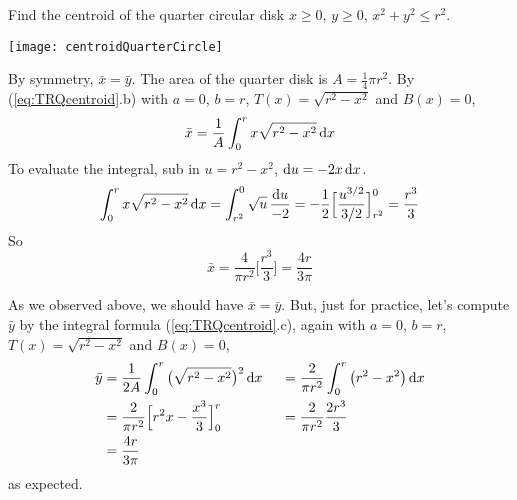 \goodbreak
\begin{eg}\label{eg:TRQcentroidBa}
  Find the centroid of the quarter circular disk $x\ge 0$,
$y\ge 0$, $x^2+y^2\le r^2$.

\begin{efig}
\begin{center}
    \texttt{[image: centroidQuarterCircle]}
\end{center}
\end{efig}

\soln  By symmetry, $\bar x=\bar y$. The area of the quarter disk
is $A=\frac{1}{4}\pi r^2$. By (\ref{eq:TRQcentroid}.b) with $a=0$, $b=r$,
$T(x)=\sqrt{r^2-x^2}$ and $B(x)=0$,
\begin{equation*}
\bar x = \frac{1}{A}\int_0^r x\sqrt{r^2-x^2}\,\mathrm{d}x
\end{equation*}
To evaluate the integral, sub in $u=r^2-x^2$, $\mathrm{d}u=-2x\,\mathrm{d}x$.
\begin{equation}\label{eq:TRQcentroidB}
\int_0^r x\sqrt{r^2-x^2}\,\mathrm{d}x = \int_{r^2}^0 \sqrt{u}\,\frac{\mathrm{d}u}{-2}
= -\frac{1}{2}\Big[\frac{u^{3/2}}{3/2}\Big]^0_{r^2}
= \frac{r^3}{3}
\end{equation}
So
\begin{equation*}
\bar x
= \frac{4}{\pi r^2}\Big[\frac{r^3}{3}\Big]
=\frac{4r}{3\pi}
\end{equation*}

As we observed above, we should have $\bar x=\bar y$. But, just for practice,
let's compute $\bar y$ by the integral formula (\ref{eq:TRQcentroid}.c),
again with $a=0$, $b=r$, $T(x)=\sqrt{r^2-x^2}$ and $B(x)=0$,
\begin{alignat*}{3}
\bar y & =  \frac{1}{2A}\int_0^r \big(\sqrt{r^2-x^2}\big)^2\,\mathrm{d}x\
 &&=  \frac{2}{\pi r^2}\int_0^r \big(r^2-x^2\big)\,\mathrm{d}x \\
 &=  \frac{2}{\pi r^2}\Big[r^2x-\frac{x^3}{3}\Big]_0^r
 &&=  \frac{2}{\pi r^2}\frac{2r^3}{3} \\
 &=\frac{4r}{3\pi}
\end{alignat*}
as expected.
\end{eg}

